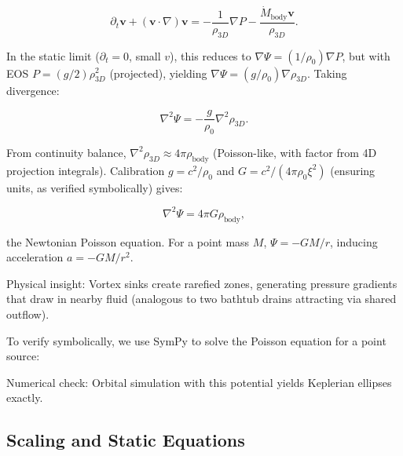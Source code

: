 \documentclass{article}
\begin{document}
\[
\partial_t \mathbf{v} + (\mathbf{v} \cdot \nabla) \mathbf{v} = -\frac{1}{\rho_{3D}} \nabla P - \frac{\dot{M}_{\text{body}} \mathbf{v}}{\rho_{3D}}.
\]

In the static limit ($\partial_t = 0$, small $v$), this reduces to $\nabla \Psi = (1 / \rho_0) \nabla P$, but with EOS $P = (g / 2) \rho_{3D}^2$ (projected), yielding $\nabla \Psi = (g / \rho_0) \nabla \rho_{3D}$. Taking divergence:

\[
\nabla^2 \Psi = -\frac{g}{\rho_0} \nabla^2 \rho_{3D}.
\]

From continuity balance, $\nabla^2 \rho_{3D} \approx 4\pi \rho_{\text{body}}$ (Poisson-like, with factor from 4D projection integrals). Calibration $g = c^2 / \rho_0$ and $G = c^2 / (4\pi \rho_0 \xi^2)$ (ensuring units, as verified symbolically) gives:

\[
\nabla^2 \Psi = 4\pi G \rho_{\text{body}},
\]

the Newtonian Poisson equation. For a point mass $M$, $\Psi = -G M / r$, inducing acceleration $a = -G M / r^2$.

Physical insight: Vortex sinks create rarefied zones, generating pressure gradients that draw in nearby fluid (analogous to two bathtub drains attracting via shared outflow).

To verify symbolically, we use SymPy to solve the Poisson equation for a point source:


Numerical check: Orbital simulation with this potential yields Keplerian ellipses exactly.

\medskip
\noindent
{}
\medskip

\subsection{Scaling and Static Equations}
\end{document}
